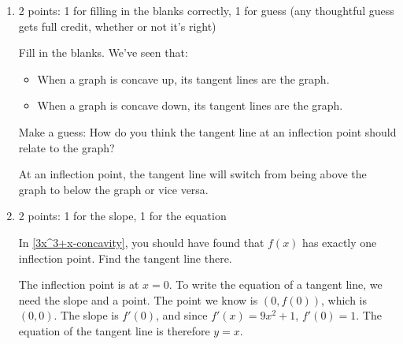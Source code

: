 \documentclass{article}
\begin{document}
\begin{enumerate}
\begin{enumerate}
\begin{solution}
    \end{solution}

  \item \label{3x^3+x-tangent-line-at-inflection-point-guess}

    \begin{grading}
      2 points: 1 for filling in the blanks correctly, 1 for guess (any thoughtful guess gets full credit, whether or not it's right)
    \end{grading}

    \begin{problem}[\nstretch{0.5}]
      Fill in the blanks. We've seen that:
      \begin{itemize}
      \item When a graph is concave up, its tangent lines are \probonly{\fitb{1in}{}} 
         the graph.
      \item When a graph is concave down, its tangent lines are \probonly{\fitb{1in}{}} 
         the graph. 
      \end{itemize}
      Make a guess: How do you think the tangent line at an inflection point should relate to the graph? 
    \end{problem}

    \begin{solution}
      At an inflection point, the tangent line will switch from being above the graph to below the graph or vice
      versa.
    \end{solution}

  \item \label{3x^3+x-tangent-line-at-inflection-point}

    \begin{grading}
      2 points: 1 for the slope, 1 for the equation
    \end{grading}

    \begin{problem}[\vfill]
      In \ref{3x^3+x-concavity}, you should have found that $f(x)$ has exactly one inflection point. Find the tangent line there. 
    \end{problem}

    \begin{solution}
      The inflection point is at $x=0$. To write the equation of a tangent line, we need the slope and a point. 
      The point we know is $(0, f(0))$, which is $(0,0)$. The slope is $f'(0)$, and since $f'(x)=9x^2+1$,
      $f'(0) = 1$. The equation of the tangent line is therefore $y=x$. 
    \end{solution}


\end{enumerate}
\end{enumerate}
\end{document}

